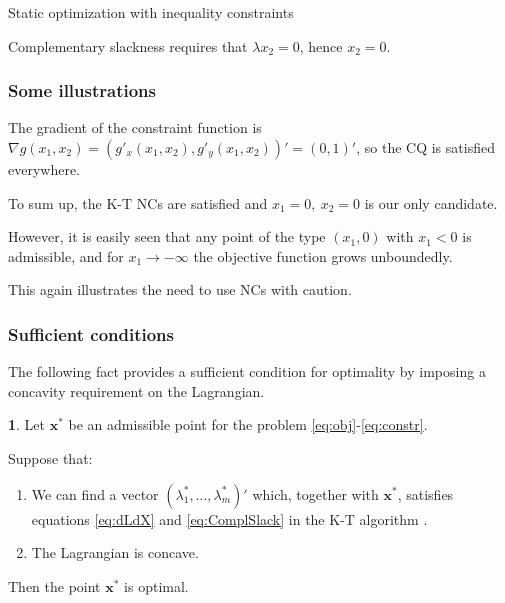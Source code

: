 \documentclass[10pt]{beamer}
\theoremstyle{definition}
\newtheorem{Fact}{\translate{Fact}}
\begin{document}
\begin{section}{Static optimization with inequality constraints}
\begin{frame}[fragile]
\begin{example}
Complementary slackness requires that $ \lambda x_2 = 0 $, hence $ x_2 = 0 $.
\label{ex:KTfail}
\end{example}
\end{frame}

\begin{frame}[fragile]
\frametitle{Some illustrations}\addtocounter{theorem}{-1}
\begin{example}[cont.]
The gradient of the constraint function is $\nabla g(x_1,x_2) = (g'_x(x_1,x_2),g'_y(x_1,x_2))' = (0,1)' $, so the CQ is satisfied everywhere. \bigskip

To sum up, the K-T NCs are satisfied and $ x_1=0,~x_2=0 $ is our only candidate.\bigskip

However, it is easily seen that any point of the type $ (x_1,0) $ with $ x_1<0 $ is admissible, and for $ x_1 \rightarrow -\infty $ the objective function grows unboundedly. 

This again illustrates the need to use NCs with caution. 
\end{example}
\end{frame}


\begin{frame}[fragile]
\frametitle{Sufficient conditions}
The following fact provides a sufficient condition for optimality by imposing a concavity requirement on the Lagrangian.

\begin{Fact}
Let $ \mathbf{x^*} $ be an admissible point for the problem \eqref{eq:obj}-\eqref{eq:constr}. 

Suppose that:\begin{enumerate}
\item We can find a vector $ (\lambda_1^*,\ldots,\lambda_m^*)' $ which, together with $ \mathbf{x^*} $, satisfies equations \eqref{eq:dLdX} and \eqref{eq:ComplSlack} in the K-T algorithm .
\item The Lagrangian is concave.
\end{enumerate}

Then the point $ \mathbf{x^*} $ is optimal.
\label{fc:SCsIneq}
\end{Fact}
\end{frame}



\end{section}
\end{document}
